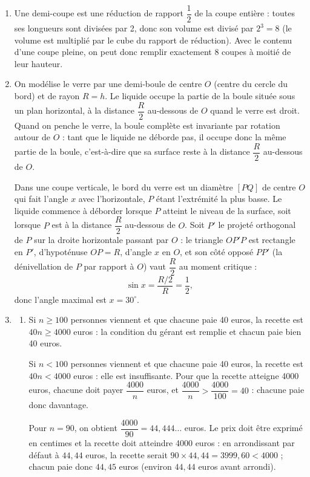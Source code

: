 \begin{enumerate}
\item Une demi-coupe est une réduction de rapport $\dfrac{1}{2}$ de la coupe entière : toutes ses longueurs sont divisées par 2, donc son volume est divisé par $2^3 = 8$ (le volume est multiplié par le cube du rapport de réduction). Avec le contenu d'une coupe pleine, on peut donc remplir exactement $\boxed{8}$ coupes à moitié de leur hauteur.

\item On modélise le verre par une demi-boule de centre $O$ (centre du cercle du bord) et de rayon $R = h$. Le liquide occupe la partie de la boule située sous un plan horizontal, à la distance $\dfrac{R}{2}$ au-dessous de $O$ quand le verre est droit. Quand on penche le verre, la boule complète est invariante par rotation autour de $O$ : tant que le liquide ne déborde pas, il occupe donc la même partie de la boule, c'est-à-dire que sa surface reste à la distance $\dfrac{R}{2}$ au-dessous de $O$.

Dans une coupe verticale, le bord du verre est un diamètre $[PQ]$ de centre $O$ qui fait l'angle $x$ avec l'horizontale, $P$ étant l'extrémité la plus basse. Le liquide commence à déborder lorsque $P$ atteint le niveau de la surface, soit lorsque $P$ est à la distance $\dfrac{R}{2}$ au-dessous de $O$. Soit $P'$ le projeté orthogonal de $P$ sur la droite horizontale passant par $O$ : le triangle $OP'P$ est rectangle en $P'$, d'hypoténuse $OP = R$, d'angle $x$ en $O$, et son côté opposé $PP'$ (la dénivellation de $P$ par rapport à $O$) vaut $\dfrac{R}{2}$ au moment critique :
\[\sin x = \frac{R/2}{R} = \frac{1}{2},\]
donc l'angle maximal est $\boxed{x = 30^\circ}$.

\item
\begin{enumerate}
    \item Si $n \geqslant 100$ personnes viennent et que chacune paie 40 euros, la recette est $40n \geqslant 4000$ euros : la condition du gérant est remplie et chacun paie bien 40 euros.

    Si $n < 100$ personnes viennent et que chacune paie 40 euros, la recette est $40n < 4000$ euros : elle est insuffisante. Pour que la recette atteigne 4000 euros, chacune doit payer $\dfrac{4000}{n}$ euros, et $\dfrac{4000}{n} > \dfrac{4000}{100} = 40$ : chacune paie donc davantage.

    Pour $n = 90$, on obtient $\dfrac{4000}{90} = 44{,}444\ldots$ euros. Le prix doit être exprimé en centimes et la recette doit atteindre 4000 euros : en arrondissant par défaut à $44{,}44$ euros, la recette serait $90 \times 44{,}44 = 3999{,}60 < 4000$ ; chacun paie donc $44{,}45$ euros (environ $44{,}44$ euros avant arrondi).


\end{enumerate}
\end{enumerate}
